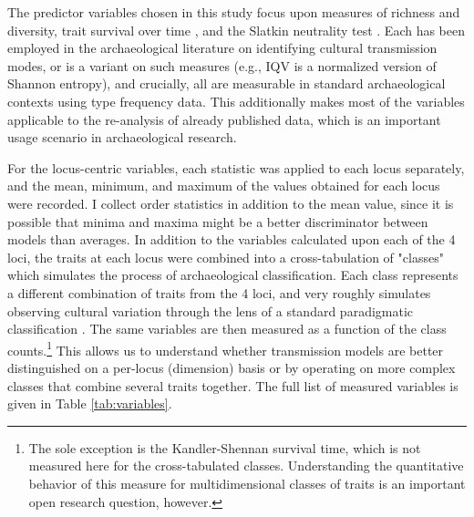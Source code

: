 \documentclass[10pt,letterpaper]{article}
\begin{document}
The predictor variables chosen in this study focus upon measures of richness and
diversity, trait survival over time \cite{kandler2013non}, and the
Slatkin neutrality test \cite{slatkin1996correction, slatkin1994exact}.
Each has been employed in the archaeological literature on identifying
cultural transmission modes, or is a variant on such measures (e.g., IQV
is a normalized version of Shannon entropy), and crucially, all are measurable in standard archaeological contexts using type frequency data.  This additionally makes most of the variables applicable to the re-analysis of already published data, which is an important usage scenario in archaeological research.   

For the locus-centric variables, each statistic was applied to each
locus separately, and the mean, minimum, and maximum of the values
obtained for each locus were recorded. I collect order statistics
in addition to the mean value, since it is possible that minima and
maxima might be a better discriminator between models than averages. In
addition to the variables calculated upon each of the 4 loci, the traits
at each locus were combined into a cross-tabulation of "classes" which simulates the
process of archaeological classification. Each class represents a
different combination of traits from the 4 loci, and very roughly
simulates observing cultural variation through the lens of a standard
paradigmatic classification \cite{Dunnell1971}. The same variables are
then measured as a function of the class counts.\footnote{The sole exception is the Kandler-Shennan survival time, which is not measured here for the cross-tabulated classes.  Understanding the quantitative behavior of this measure for multidimensional classes of traits is an important open research question, however.} This allows us to
understand whether transmission models are better distinguished on a
per-locus (dimension) basis or by operating on more complex classes that
combine several traits together. The full list of measured variables is
given in Table \ref{tab:variables}.
\end{document}

